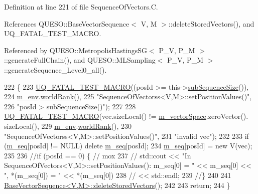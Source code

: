 Definition at line 221 of file Sequence\-Of\-Vectors.\-C.



References Q\-U\-E\-S\-O\-::\-Base\-Vector\-Sequence$<$ V, M $>$\-::delete\-Stored\-Vectors(), and U\-Q\-\_\-\-F\-A\-T\-A\-L\-\_\-\-T\-E\-S\-T\-\_\-\-M\-A\-C\-R\-O.



Referenced by Q\-U\-E\-S\-O\-::\-Metropolis\-Hastings\-S\-G$<$ P\-\_\-\-V, P\-\_\-\-M $>$\-::generate\-Full\-Chain(), and Q\-U\-E\-S\-O\-::\-M\-L\-Sampling$<$ P\-\_\-\-V, P\-\_\-\-M $>$\-::generate\-Sequence\-\_\-\-Level0\-\_\-all().


\begin{DoxyCode}
222 \{
223   \hyperlink{_defines_8h_a56d63d18d0a6d45757de47fcc06f574d}{UQ\_FATAL\_TEST\_MACRO}((posId >= this->\hyperlink{class_q_u_e_s_o_1_1_sequence_of_vectors_a0224bd3e961d86af5d2886301c0c2b86}{subSequenceSize}()),
224                       \hyperlink{class_q_u_e_s_o_1_1_base_vector_sequence_a8e8824d2a63c5a43bcc6473e3a0491e8}{m\_env}.\hyperlink{class_q_u_e_s_o_1_1_base_environment_a78b57112bbd0e6dd0e8afec00b40ffa7}{worldRank}(),
225                       \textcolor{stringliteral}{"SequenceOfVectorss<V,M>::setPositionValues()"},
226                       \textcolor{stringliteral}{"posId > subSequenceSize()"});
227 
228   \hyperlink{_defines_8h_a56d63d18d0a6d45757de47fcc06f574d}{UQ\_FATAL\_TEST\_MACRO}(vec.sizeLocal() != \hyperlink{class_q_u_e_s_o_1_1_base_vector_sequence_a4bd171e39ed050ff105c808336f35198}{m\_vectorSpace}.zeroVector().
      sizeLocal(),
229                       \hyperlink{class_q_u_e_s_o_1_1_base_vector_sequence_a8e8824d2a63c5a43bcc6473e3a0491e8}{m\_env}.\hyperlink{class_q_u_e_s_o_1_1_base_environment_a78b57112bbd0e6dd0e8afec00b40ffa7}{worldRank}(),
230                       \textcolor{stringliteral}{"SequenceOfVectorss<V,M>::setPositionValues()"},
231                       \textcolor{stringliteral}{"invalid vec"});
232 
233   \textcolor{keywordflow}{if} (\hyperlink{class_q_u_e_s_o_1_1_sequence_of_vectors_ae83e7c53439265667809256d0d302e5b}{m\_seq}[posId] != NULL) \textcolor{keyword}{delete} \hyperlink{class_q_u_e_s_o_1_1_sequence_of_vectors_ae83e7c53439265667809256d0d302e5b}{m\_seq}[posId];
234   \hyperlink{class_q_u_e_s_o_1_1_sequence_of_vectors_ae83e7c53439265667809256d0d302e5b}{m\_seq}[posId] = \textcolor{keyword}{new} V(vec);
235 
236   \textcolor{comment}{//if (posId == 0) \{ // mox}
237   \textcolor{comment}{//  std::cout << "In SequenceOfVectors<V,M>::setPositionValues(): m\_seq[0] = " << m\_seq[0] << ",
       *(m\_seq[0]) = " << *(m\_seq[0])}
238   \textcolor{comment}{//            << std::endl;}
239   \textcolor{comment}{//\}}
240 
241   \hyperlink{class_q_u_e_s_o_1_1_base_vector_sequence_a5609e02046ba555f0eebe49c6c231faf}{BaseVectorSequence<V,M>::deleteStoredVectors}();
242 
243   \textcolor{keywordflow}{return};
244 \}
\end{DoxyCode}
